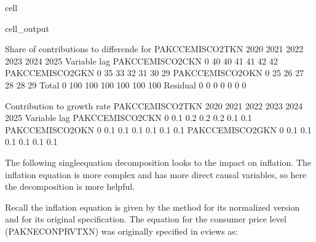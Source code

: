 \documentclass[letterpaper,10pt,english]{jupyterBook}
\begin{document}
\begin{sphinxuseclass}{cell}
\begin{sphinxVerbatimOutput}
\begin{sphinxuseclass}{cell_output}
\begin{sphinxVerbatim}[commandchars=\\\{\}]
 Share of contributions to differende for  PAKCCEMISCO2TKN
                           2020        2021        2022        2023        2024        2025
Variable        lag                                                                        
PAKCCEMISCO2CKN 0           40\PYGZpc{}         40\PYGZpc{}         41\PYGZpc{}         41\PYGZpc{}         42\PYGZpc{}         42\PYGZpc{}
PAKCCEMISCO2GKN 0           35\PYGZpc{}         33\PYGZpc{}         32\PYGZpc{}         31\PYGZpc{}         30\PYGZpc{}         29\PYGZpc{}
PAKCCEMISCO2OKN 0           25\PYGZpc{}         26\PYGZpc{}         27\PYGZpc{}         28\PYGZpc{}         28\PYGZpc{}         29\PYGZpc{}
Total           0          100\PYGZpc{}        100\PYGZpc{}        100\PYGZpc{}        100\PYGZpc{}        100\PYGZpc{}        100\PYGZpc{}
Residual        0            0\PYGZpc{}          0\PYGZpc{}          0\PYGZpc{}          0\PYGZpc{}          0\PYGZpc{}          0\PYGZpc{}

 Contribution to growth rate PAKCCEMISCO2TKN
                           2020        2021        2022        2023        2024        2025
Variable        lag                                                                        
PAKCCEMISCO2CKN 0         \PYGZhy{}0.1\PYGZpc{}       \PYGZhy{}0.2\PYGZpc{}       \PYGZhy{}0.2\PYGZpc{}       \PYGZhy{}0.2\PYGZpc{}       \PYGZhy{}0.1\PYGZpc{}       \PYGZhy{}0.1\PYGZpc{}
PAKCCEMISCO2OKN 0         \PYGZhy{}0.1\PYGZpc{}       \PYGZhy{}0.1\PYGZpc{}       \PYGZhy{}0.1\PYGZpc{}       \PYGZhy{}0.1\PYGZpc{}       \PYGZhy{}0.1\PYGZpc{}       \PYGZhy{}0.1\PYGZpc{}
PAKCCEMISCO2GKN 0         \PYGZhy{}0.1\PYGZpc{}       \PYGZhy{}0.1\PYGZpc{}       \PYGZhy{}0.1\PYGZpc{}       \PYGZhy{}0.1\PYGZpc{}       \PYGZhy{}0.1\PYGZpc{}       \PYGZhy{}0.1\PYGZpc{}
\end{sphinxVerbatim}

\end{sphinxuseclass}\end{sphinxVerbatimOutput}

\end{sphinxuseclass}
\sphinxAtStartPar
The following single\sphinxhyphen{}equation decomposition looks to the impact on inflation.  The inflation equation is more complex and has more direct causal variables, so here the decomposition is more helpful.

\sphinxAtStartPar
Recall the inflation equation is given by the  method for its normalized version and  for its original specification.  The equation for the consumer price level (PAKNECONPRVTXN) was originally specified in eviews as:
\end{document}
